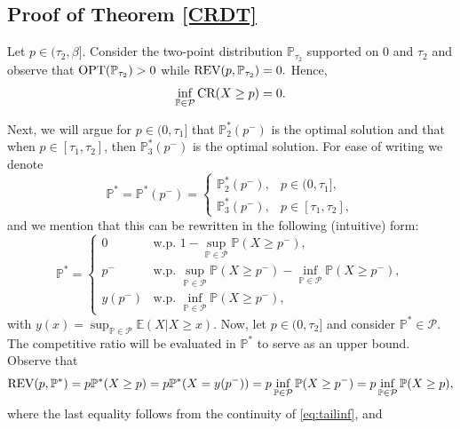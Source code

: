 \documentclass[11pt]{article}
\newcommand{\bP}{\mathbb{P}}
\newcommand{\cP}{\mathcal{P}}
\newcommand{\bE}{\mathbb{E}}
\newcommand{\1}{\mathds{1}}
\begin{document}
\subsection{Proof of Theorem \ref{CRDT}}\label{sec23pointsfundproof}
Let $p \in (\tau_2,\beta]$. Consider the two-point distribution $\bP_{\tau_2}$ supported on $0$ and $\tau_2$ and observe that $\textup{OPT}(\bP_{\tau_2})>0$ while $\textup{REV}(p,\bP_{\tau_2}) = 0.$ Hence, $$\inf_{\bP\in\cP}\textup{CR}(X\geq p) = 0.$$

Next, we will argue for $p \in (0,\tau_1]$ that $\bP^*_2(p^-)$ is the optimal solution and that when $p \in [\tau_1,\tau_2]$, then $\bP^*_3(p^-)$ is the optimal solution. For ease of writing we denote $$\bP^* = \bP^*(p^-) = 
\begin{cases}
\bP^*_2(p^-), & p \in (0, \tau_1], \\
\bP^*_3(p^-), & p \in [\tau_1, \tau_2],
\end{cases}
$$
and we mention that this can be rewritten in the following (intuitive) form:
$$\bP^*=
\left\{ \begin{array}{ll}
        0 & \text{w.p. } 1 - \sup_{\bP \in \cP} \bP(X \geq p^-), \\
        p^- & \text{w.p. } \sup_{\bP \in \cP} \bP(X \geq p^-) - \inf_{\bP \in \cP} \bP(X \geq p^-), \\
        y(p^-) & \text{w.p. } \inf_{\bP \in \cP} \bP(X \geq p^-),
    \end{array}\right.
$$
with $y(x) = \sup_{\bP \in \cP}\bE(X|X\geq x)$. Now, let $p \in (0,\tau_2]$ and consider $\bP^*\in\cP$. The competitive ratio will be evaluated in $\bP^*$ to serve as an upper bound. Observe that
\begin{align*}
    \textup{REV}(p,\bP^*) = p\bP^*(X\geq p) = p\bP^*(X = y(p^-))=p\inf_{\bP\in \cP}\bP(X\geq p^-)= p\inf_{\bP\in \cP}\bP(X\geq p),
\end{align*}
where the last equality follows from the continuity of \eqref{eq:tailinf}, and
\end{document}
